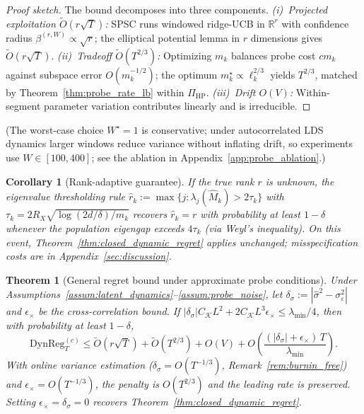\documentclass{article}
\newcommand{\R}{\mathbb{R}}
\newcommand{\DynReg}{\mathrm{DynReg}}
\newtheorem{theorem}{Theorem}
\newtheorem{corollary}{Corollary}
\begin{document}
  \begin{proof}[Proof sketch]
  The bound decomposes into three components.
  \emph{(i)~Projected exploitation $\widetilde{O}(r\sqrt{T})$:} SPSC runs windowed ridge-UCB in $\R^r$ with confidence radius $\beta^{(r,W)} \propto \sqrt{r}$; the elliptical potential lemma in $r$ dimensions gives $\widetilde{O}(r\sqrt{T})$.
  \emph{(ii)~Tradeoff $\widetilde{O}(T^{2/3})$:} Optimizing $m_k$ balances probe cost $cm_k$ against subspace error $O(m_k^{-1/2})$; the optimum $m_k^\star \propto \ell_k^{2/3}$ yields $T^{2/3}$, matched by Theorem~\ref{thm:probe_rate_lb} within $\Pi_{\mathrm{HP}}$.
  \emph{(iii)~Drift $O(V)$:} Within-segment parameter variation contributes linearly and is irreducible.
  \end{proof}

  (The worst-case choice $W^\star\!=\!1$ is conservative; under autocorrelated LDS dynamics larger windows reduce variance without inflating drift, so experiments use $W\!\in\![100,400]$; see the ablation in Appendix~\ref{app:probe_ablation}.)

  \begin{corollary}[Rank-adaptive guarantee]
  \label{cor:rank_adaptive}
  If the true rank $r$ is unknown, the eigenvalue thresholding rule
  $\hat r_k := \max\{j : \lambda_j(\widehat M_k) > 2\tau_k\}$ with
  $\tau_k = 2R_X\sqrt{\log(2d/\delta)/m_k}$
  recovers $\hat r_k = r$ with probability at least $1-\delta$ whenever the
  population eigengap exceeds $4\tau_k$ (via Weyl's inequality).
  On this event, Theorem~\ref{thm:closed_dynamic_regret} applies unchanged; misspecification costs are in Appendix~\ref{sec:discussion}.
  \end{corollary}

  \begin{theorem}[General regret bound under approximate probe conditions]
  \label{thm:closed_dynamic_regret_general}
  \label{cor:regret_misspecified_variance}
  Under Assumptions~\ref{assum:latent_dynamics}--\ref{assum:probe_noise}, let $\delta_\sigma := |\hat\sigma^2 -
  \sigma_\varepsilon^2|$ and $\epsilon_\times$ be the cross-correlation bound. If $|\delta_\sigma|C_{\mathcal K}L^2 + 2C_{\mathcal
  K}L^3\epsilon_\times \le \lambda_{\min}/4$, then with probability at least $1-\delta$,
  \begin{equation}
  \DynReg_T^{(c)} \le \widetilde O(r\sqrt{T}) + \widetilde O(T^{2/3}) + O(V) + O\!\left(\frac{(|\delta_\sigma| +
  \epsilon_\times)\,T}{\lambda_{\min}}\right).
  \label{eq:general_bound}
  \end{equation}
  With online variance estimation ($\delta_\sigma = O(T^{-1/3})$, Remark~\ref{rem:burnin_free}) and $\epsilon_\times = O(T^{-1/3})$,
  the penalty is $O(T^{2/3})$ and the leading rate is preserved. Setting $\epsilon_\times = \delta_\sigma = 0$ recovers
  Theorem~\ref{thm:closed_dynamic_regret}.
  \end{theorem}
\end{document}
